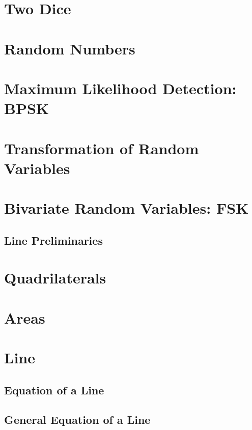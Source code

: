 \documentclass[11pt]{book}
\begin{document}
\chapter{Two Dice}

\chapter{Random Numbers}

\chapter{Maximum Likelihood Detection: BPSK}

\chapter{Transformation of Random Variables}

\chapter{Bivariate Random Variables: FSK}

%

\iffalse
\section{Line Preliminaries}
\chapter{ Quadrilaterals}

\chapter{Areas }
\chapter{Line}
\section{Equation of a Line}
\section{General Equation of a Line}
\end{document}
